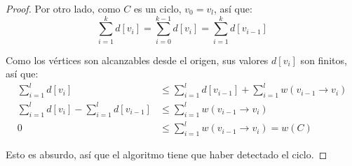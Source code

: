 \documentclass[a4paper]{report}
\begin{document}
\begin{proof}
    Por otro lado, como $C$ es un ciclo, $v_0 = v_l$, así que:
    $$\sum_{i = 1}^k d[v_i] = \sum_{i = 0}^{k - 1} d[v_i] = \sum_{i = 1}^k d[v_{i - 1}]$$

    Como los vértices son alcanzables desde el origen, sus valores $d[v_i]$ son finitos, así que:
    \begin{align*}
        \sum_{i = 1}^l d[v_i] & \leq \sum_{i = 1}^l d[v_{i - 1}] + \sum_{i = 1}^l w(v_{i - 1} \rightarrow v_i) \\
        \sum_{i = 1}^l d[v_i] - \sum_{i = 1}^l d[v_{i - 1}] & \leq \sum_{i = 1}^l w(v_{i - 1} \rightarrow v_i) \\
        0 & \leq \sum_{i = 1}^l w(v_{i - 1} \rightarrow v_i) = w(C) 
    \end{align*}

    Esto es absurdo, así que el algoritmo tiene que haber detectado el ciclo.
    
\end{proof}

\label{flujo}

\label{reducciones}

\label{np-hard}
\end{document}
